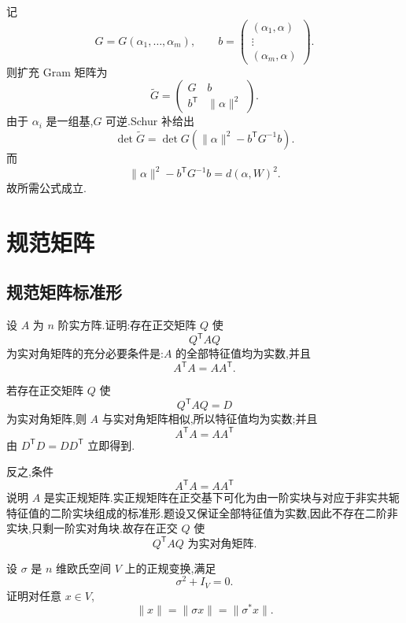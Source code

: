 \begin{solution}
记
\[
G=G(\alpha_1,\ldots,\alpha_m),
\qquad
b=
\begin{pmatrix}
(\alpha_1,\alpha)\\
\vdots\\
(\alpha_m,\alpha)
\end{pmatrix}.
\]
则扩充 Gram 矩阵为
\[
\widetilde G
=
\begin{pmatrix}
G&b\\
b^{\mathsf T}&\|\alpha\|^2
\end{pmatrix}.
\]
由于 $\alpha_i$ 是一组基,$G$ 可逆.Schur 补给出
\[
\det\widetilde G
=
\det G
\left(
\|\alpha\|^2-b^{\mathsf T}G^{-1}b
\right).
\]
而
\[
\|\alpha\|^2-b^{\mathsf T}G^{-1}b
=
d(\alpha,W)^2.
\]
故所需公式成立.
\end{solution}


\newpage

\section{规范矩阵}

\subsection{规范矩阵标准形}

\begin{example}
设 $A$ 为 $n$ 阶实方阵.证明:存在正交矩阵 $Q$ 使
\[
Q^{\mathsf T}AQ
\]
为实对角矩阵的充分必要条件是:$A$ 的全部特征值均为实数,并且
\[
A^{\mathsf T}A=AA^{\mathsf T}.
\]
\end{example}
\exampleblank

\begin{solution}
若存在正交矩阵 $Q$ 使
\[
Q^{\mathsf T}AQ=D
\]
为实对角矩阵,则 $A$ 与实对角矩阵相似,所以特征值均为实数;并且
\[
A^{\mathsf T}A=AA^{\mathsf T}
\]
由 $D^{\mathsf T}D=DD^{\mathsf T}$ 立即得到.

反之,条件
\[
A^{\mathsf T}A=AA^{\mathsf T}
\]
说明 $A$ 是实正规矩阵.实正规矩阵在正交基下可化为由一阶实块与对应于非实共轭特征值的二阶实块组成的标准形.题设又保证全部特征值为实数,因此不存在二阶非实块,只剩一阶实对角块.故存在正交 $Q$ 使
\[
\boxed{Q^{\mathsf T}AQ\text{ 为实对角矩阵}.}
\]
\end{solution}


\begin{example}
设 $\sigma$ 是 $n$ 维欧氏空间 $V$ 上的正规变换,满足
\[
\sigma^2+I_V=0.
\]
证明对任意 $x\in V$,
\[
\|x\|=\|\sigma x\|=\|\sigma^*x\|.
\]
\end{example}
\exampleblank


